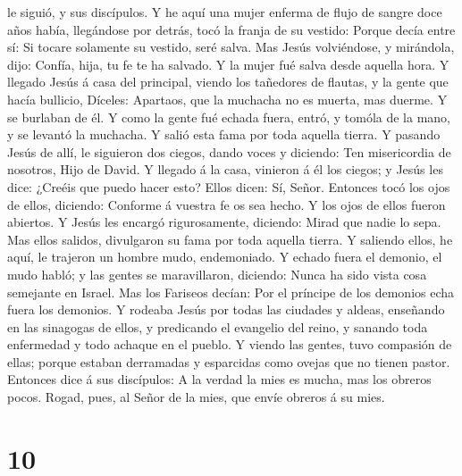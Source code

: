 le siguió, y sus discípulos.  Y he aquí una mujer enferma
de flujo de sangre doce años había, llegándose por detrás, tocó la
franja de su vestido:  Porque decía entre sí: Si tocare
solamente su vestido, seré salva.  Mas Jesús volviéndose,
y mirándola, dijo: Confía, hija, tu fe te ha salvado. Y la mujer fué
salva desde aquella hora.  Y llegado Jesús á casa del
principal, viendo los tañedores de flautas, y la gente que hacía
bullicio,  Díceles: Apartaos, que la muchacha no es
muerta, mas duerme. Y se burlaban de él.  Y como la gente
fué echada fuera, entró, y tomóla de la mano, y se levantó la muchacha.
 Y salió esta fama por toda aquella tierra.
 Y pasando Jesús de allí, le siguieron dos ciegos, dando
voces y diciendo: Ten misericordia de nosotros, Hijo de David.
 Y llegado á la casa, vinieron á él los ciegos; y Jesús
les dice: ¿Creéis que puedo hacer esto? Ellos dicen: Sí, Señor.
 Entonces tocó los ojos de ellos, diciendo: Conforme á
vuestra fe os sea hecho.  Y los ojos de ellos fueron
abiertos. Y Jesús les encargó rigurosamente, diciendo: Mirad que nadie
lo sepa.  Mas ellos salidos, divulgaron su fama por toda
aquella tierra.  Y saliendo ellos, he aquí, le trajeron
un hombre mudo, endemoniado.  Y echado fuera el demonio,
el mudo habló; y las gentes se maravillaron, diciendo: Nunca ha sido
vista cosa semejante en Israel.  Mas los Fariseos decían:
Por el príncipe de los demonios echa fuera los demonios. 
Y rodeaba Jesús por todas las ciudades y aldeas, enseñando en las
sinagogas de ellos, y predicando el evangelio del reino, y sanando toda
enfermedad y todo achaque en el pueblo.  Y viendo las
gentes, tuvo compasión de ellas; porque estaban derramadas y esparcidas
como ovejas que no tienen pastor.  Entonces dice á sus
discípulos: A la verdad la mies es mucha, mas los obreros pocos.
 Rogad, pues, al Señor de la mies, que envíe obreros á su
mies.

\hypertarget{section-9}{%
\section{10}\label{section-9}}

